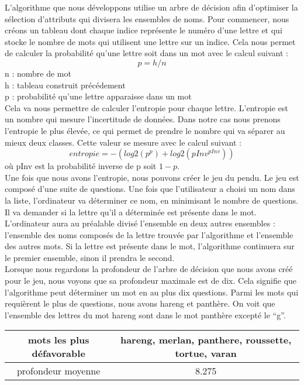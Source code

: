 \documentclass[a4paper,11pt]{article}
\begin{document}
  L'algorithme que nous développons utilise un arbre de décision afin d'optimiser la sélection d'attributs qui
  divisera les ensembles de noms. Pour commencer, nous créons un tableau dont chaque indice représente le numéro
  d'une lettre et qui stocke le nombre de mots qui utilisent une lettre sur un indice. Cela nous permet de calculer
  la probabilité qu'une lettre soit dans un mot avec le calcul suivant :
  $$ p = h / n $$
  n : nombre de mot\\
  h : tableau construit précédement\\
  p : probabilité qu'une lettre apparaisse dans un mot\\
  
  Cela va nous permettre de calculer l'entropie pour chaque lettre. L'entropie est un nombre qui mesure
  l'incertitude de données. Dans notre cas nous prenons l'entropie le plus élevée, ce qui permet de prendre
  le nombre qui va séparer au mieux deux classes. Cette valeur se mesure avec le calcul suivant :
  $$entropie = -(log2(p ^{p}) + log2(pInv ^{pInv}))$$ où pInv est la probabilité inverse de p soit $1-p$.\\
  
  Une fois que nous avons l'entropie, nous pouvons créer le jeu du pendu. Le jeu est composé d'une suite de questions.
  Une fois que l'utilisateur a choisi un nom dans la liste, l'ordinateur va déterminer ce nom, en minimisant le nombre de questions. Il va demander
  si la lettre qu'il a déterminée est présente dans le mot. L'ordinateur aura au préalable divisé l'ensemble en 
  deux autres ensembles : l'ensemble des noms composés de la lettre trouvée par l'algorithme et l'ensemble des autres mots. 
  Si la lettre est présente dans le mot, l'algorithme continuera sur le premier ensemble, sinon il prendra le second.\\
  
 Lorsque nous regardons la profondeur de l'arbre de décision que nous avons créé pour le jeu, nous voyons que
sa profondeur maximale est de dix. Cela signifie que l'algorithme peut déterminer un mot en au plus dix
questions. Parmi les mots qui requièrent le plus de questions, nous avons hareng et panthère. On voit que
l'ensemble des lettres du mot hareng sont dans le mot panthère excepté le \enquote{g}.\\
 
  \begin{tabular}{|c|c|}
  \hline
   mots les plus défavorable & hareng, merlan, panthere, roussette, tortue, varan\\
   \hline
   profondeur moyenne & 8.275\\
   \hline
  \end{tabular}
\end{document}
